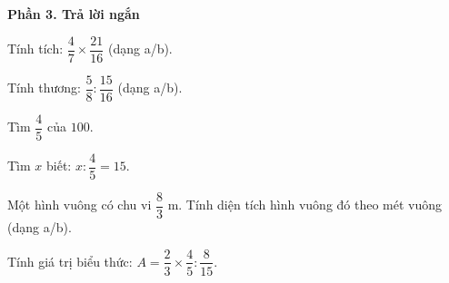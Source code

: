 \textbf{Phần 3. Trả lời ngắn}

\begin{ex} %
Tính tích: $\dfrac{4}{7} \times \dfrac{21}{16}$ (dạng a/b).
\end{ex}

\begin{ex} %
Tính thương: $\dfrac{5}{8} : \dfrac{15}{16}$ (dạng a/b).
\end{ex}

\begin{ex} %
Tìm $\dfrac{4}{5}$ của $100$.
\end{ex}

\begin{ex} %
Tìm $x$ biết: $x : \dfrac{4}{5} = 15$.
\end{ex}

\begin{ex} %
Một hình vuông có chu vi $\dfrac{8}{3}\text{ m}$. Tính diện tích hình vuông đó theo mét vuông (dạng a/b).
\end{ex}

\begin{ex} %
Tính giá trị biểu thức: $A = \dfrac{2}{3} \times \dfrac{4}{5} : \dfrac{8}{15}$.
\end{ex}

